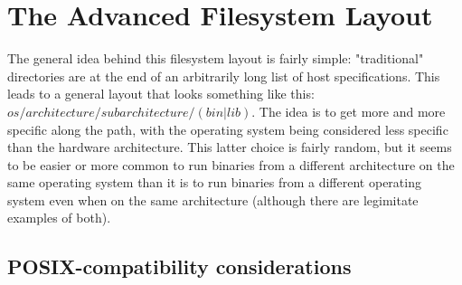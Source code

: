 \documentclass[a4paper,twoside,titlepage]{article}
\begin{document}
\section{The Advanced Filesystem Layout}
The general idea behind this filesystem layout is fairly simple: "traditional"
directories are at the end of an arbitrarily long list of host specifications.
This leads to a general layout that looks something like this:
$os/architecture/subarchitecture/(bin|lib)$. The idea is to get more and more
specific along the path, with the operating system being considered less
specific than the hardware architecture. This latter choice is fairly random,
but it seems to be easier or more common to run binaries from a different
architecture on the same operating system than it is to run binaries from a
different operating system even when on the same architecture (although there
are legimitate examples of both).

\subsection{POSIX-compatibility considerations}

\newpage

\begin{thebibliography}{alpha}

\end{thebibliography}
\end{document}
